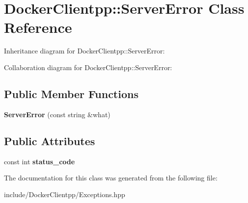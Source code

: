 \hypertarget{classDockerClientpp_1_1ServerError}{}\section{Docker\+Clientpp\+::Server\+Error Class Reference}
\label{classDockerClientpp_1_1ServerError}


Inheritance diagram for Docker\+Clientpp\+::Server\+Error\+:


Collaboration diagram for Docker\+Clientpp\+::Server\+Error\+:
\subsection*{Public Member Functions}
\begin{DoxyCompactItemize}
\item 
\mbox{\label{classDockerClientpp_1_1ServerError_ac72230550233b9a5e8d9296086057356}} 
{\bfseries Server\+Error} (const string \&what)
\end{DoxyCompactItemize}
\subsection*{Public Attributes}
\begin{DoxyCompactItemize}
\item 
\mbox{\label{classDockerClientpp_1_1ServerError_a55833e067b3c8ca292f130ca8bc3c3f5}} 
const int {\bfseries status\+\_\+code}
\end{DoxyCompactItemize}


The documentation for this class was generated from the following file\+:\begin{DoxyCompactItemize}
\item 
include/\+Docker\+Clientpp/Exceptions.\+hpp\end{DoxyCompactItemize}
